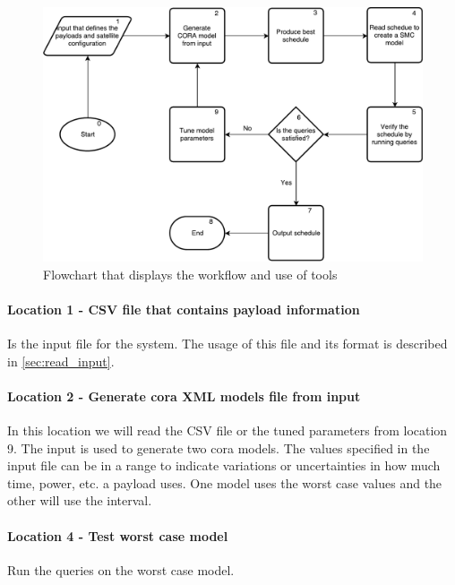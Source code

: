 \begin{figure}[h]
	\includegraphics[width=\textwidth]{graphics/flow_final.pdf}
	\caption{Flowchart that displays the workflow and use of tools}
	\label{fig:tool1}
\end{figure}

\paragraph{Location 1 - CSV file that contains payload information} 
Is the input file for the system. 
The usage of this file and its format is described in \cref{sec:read_input}.

\paragraph{Location 2 - Generate \gls{cora} XML models file from input} 
In this location we will read the CSV file or the tuned parameters from location 9. 
The input is used to generate two \gls{cora} models.
The values specified in the input file can be in a range to indicate variations or uncertainties in how much time, power, etc. a payload uses.
One model uses the worst case values and the other will use the interval. 


\paragraph{Location 4 - Test worst case model} 
Run the queries on the worst case model.


